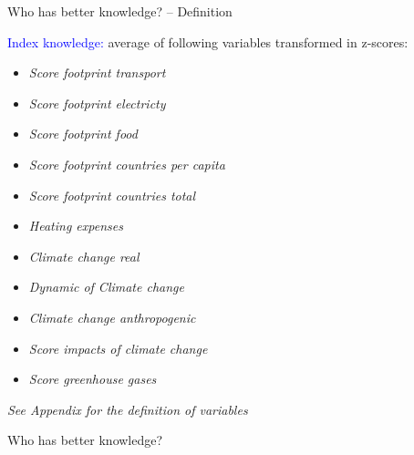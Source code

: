 \begin{framefont}{\small}
\begin{frame}{Who has better knowledge? -- Definition}
 \begin{center}
     {\textcolor{blue}{Index knowledge:} average of following variables transformed in z-scores:}
\begin{multicols}{2}
\begin{itemize}
	\item {\scriptsize \textit{Score footprint transport}}
	\item  {\scriptsize  \textit{Score footprint electricty}}
	\item  {\scriptsize \textit{Score footprint food}}
	\item {\scriptsize  \textit{Score footprint countries per capita}}
	\item  {\scriptsize \textit{Score footprint countries total}}
	\item  {\scriptsize \textit{Heating expenses}}
	\item  {\scriptsize \textit{Climate change real}}
	\item  {\scriptsize \textit{Dynamic of Climate change}}
	\item  {\scriptsize \textit{Climate change anthropogenic}}
	\item {\scriptsize \textit{Score impacts of climate change}}
	\item {\scriptsize \textit{Score greenhouse gases}}
\end{itemize}
\end{multicols}
\vspace{1.5cm}
 \end{center}
{\scriptsize \textit{See Appendix for the definition of variables}}
\end{frame}



\begin{frame}{Who has better knowledge?%
	}


\end{frame}
\end{framefont}
